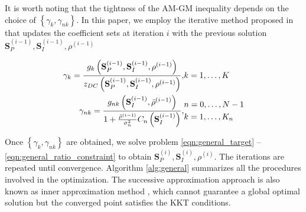It is worth noting that the tightness of the AM-GM inequality depends on the choice of $\left\{ {{\gamma _k},{\gamma _{nk}}} \right\}$. In this paper, we employ the iterative method proposed in \cite{Clerckx2018} that updates the coefficient sets at iteration $i$ with the previous solution ${{\mathbf{S}}_P^{(i - 1)},{\mathbf{S}}_I^{(i - 1)},{\rho ^{(i - 1)}}}$

\begin{eqnarray}
  {{\gamma _k} = \frac{{{g_k}\left( {{\mathbf{S}}_P^{(i - 1)},{\mathbf{S}}_I^{(i - 1)},{\rho ^{(i - 1)}}} \right)}}{{{z_{DC}}\left( {{\mathbf{S}}_P^{(i - 1)},{\mathbf{S}}_I^{(i - 1)},{\rho ^{(i - 1)}}} \right)}},}&{k = 1, \ldots ,K} \\
  {{\gamma _{nk}} = \frac{{{g_{nk}}\left( {{\mathbf{S}}_I^{(i - 1)},{{\bar \rho }^{(i - 1)}}} \right)}}{{1 + \frac{{{{\bar \rho }^{(i - 1)}}}}{{\sigma _n^2}}{C_n}\left( {{\mathbf{S}}_I^{(i - 1)}} \right)}},}&\begin{gathered}
  n = 0, \ldots ,N - 1 \hfill \\
  k = 1, \ldots ,{K_n} \hfill \\
\end{gathered}
\end{eqnarray}

Once $\left\{ {{\gamma _k},{\gamma _{nk}}} \right\}$ are obtained, we solve problem \ref{eqn:general_target} -- \ref{eqn:general_ratio_constraint} to obtain ${\mathbf{S}}_P^{(i)},{\mathbf{S}}_I^{(i)},{\rho ^{(i)}}$. The iterations are repeated until convergence. Algorithm \ref{alg:general} summarizes all the procedures involved in the optimization. The successive approximation approach is also known as inner approximation method \cite{Marks1978}, which cannot guarantee a global optimal solution but the converged point satisfies the KKT conditions. 

